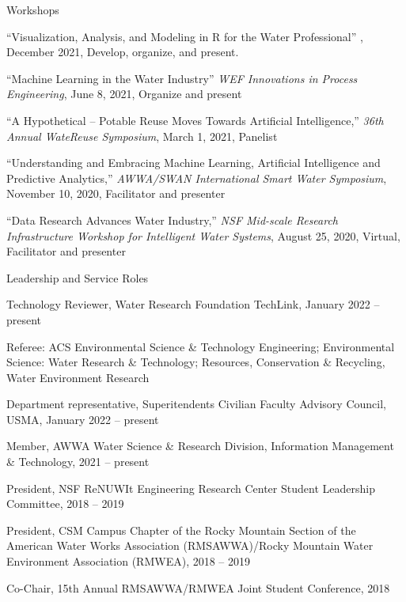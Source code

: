 \documentclass{resume} %
\begin{document}

\begin{rSection}{Workshops}

``Visualization, Analysis, and Modeling in R for the Water Professional'' , December 2021, Develop, organize, and present.

``Machine Learning in the Water Industry'' \emph{WEF Innovations in Process Engineering}, June 8, 2021, Organize and present

``A Hypothetical – Potable Reuse Moves Towards Artificial Intelligence,'' \emph{36th Annual WateReuse Symposium}, March 1, 2021, Panelist

``Understanding and Embracing Machine Learning, Artificial Intelligence and Predictive Analytics,'' \emph{AWWA/SWAN International Smart Water Symposium}, November 10, 2020, Facilitator and presenter

``Data Research Advances Water Industry,'' \emph{NSF Mid-scale Research Infrastructure Workshop for Intelligent Water Systems}, August 25, 2020, Virtual, Facilitator and presenter

\end{rSection}



\begin{rSection}{Leadership and Service Roles}

Technology Reviewer, Water Research Foundation TechLink, January 2022 – present

Referee: ACS Environmental Science \& Technology Engineering; Environmental Science: Water Research \& Technology; Resources, Conservation \& Recycling, Water Environment Research

Department representative, Superitendents Civilian Faculty Advisory Council, USMA, January 2022 – present

Member, AWWA Water Science \& Research Division, Information Management \& Technology, 2021 – present

President, NSF ReNUWIt Engineering Research Center Student Leadership Committee, 2018 – 2019

President, CSM Campus Chapter of the Rocky Mountain Section of the American Water Works Association (RMSAWWA)/Rocky Mountain Water Environment Association (RMWEA), 2018 – 2019

Co-Chair, 15th Annual RMSAWWA/RMWEA Joint Student Conference, 2018

\end{rSection}
\end{document}
